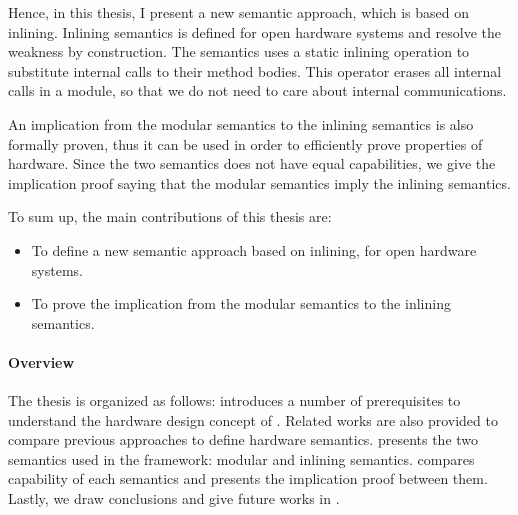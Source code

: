 Hence, in this thesis, I present a new semantic approach, which is
based on inlining. Inlining semantics is defined for open hardware
systems and resolve the weakness by construction. The semantics uses a
static inlining operation to substitute internal calls to their method
bodies. This operator erases all internal calls in a module, so that
we do not need to care about internal communications.

An implication from the modular semantics to the inlining semantics is
also formally proven, thus it can be used in order to efficiently
prove properties of hardware. Since the two semantics does not have
equal capabilities, we give the implication proof saying that the
modular semantics imply the inlining semantics.

To sum up, the main contributions of this thesis are:
\begin{itemize}
\item To define a new semantic approach based on inlining, for open
  hardware systems.
\item To prove the implication from the modular semantics to the
  inlining semantics.
\end{itemize}

\paragraph{Overview}

The thesis is organized as follows: 
introduces a number of prerequisites to understand the hardware design
concept of \Bluespec{}. Related works are also provided to compare
previous approaches to define hardware semantics.
 presents the two semantics used in the
\Kami{} framework: modular and inlining
semantics.  compares capability of each
semantics and presents the implication proof between them. Lastly, we
draw conclusions and give future works in .

